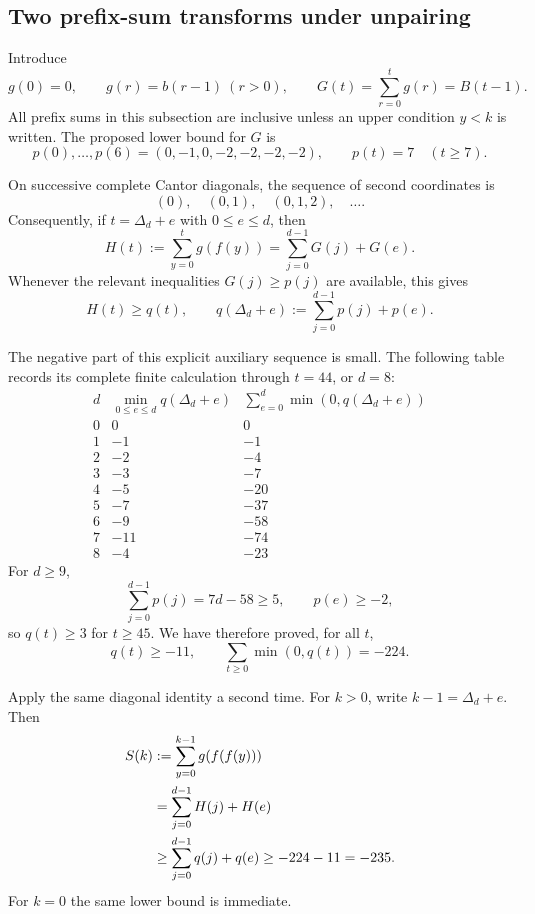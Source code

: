 \subsection{Two prefix-sum transforms under unpairing}

Introduce
\[
 g(0)=0,\qquad g(r)=b(r-1)\ (r>0),\qquad
 G(t)=\sum_{r=0}^t g(r)=B(t-1).
\]
All prefix sums in this subsection are inclusive unless an upper
condition $y<k$ is written. The proposed lower bound for $G$ is
\begin{equation}
 p(0),\ldots,p(6)=(0,-1,0,-2,-2,-2,-2),
 \qquad p(t)=7\quad(t\geq7).
 \label{eq:tail-p}
\end{equation}

On successive complete Cantor diagonals, the sequence of second
coordinates is
\[
 (0),\quad(0,1),\quad(0,1,2),\quad\ldots.
\]
Consequently, if $t=\Delta_d+e$ with $0\leq e\leq d$, then
\begin{equation}
 H(t):=\sum_{y=0}^t g(f(y))
       =\sum_{j=0}^{d-1}G(j)+G(e).
 \label{eq:tail-first-transform}
\end{equation}
Whenever the relevant inequalities $G(j)\geq p(j)$ are available, this
gives
\[
 H(t)\geq q(t),\qquad
 q(\Delta_d+e):=\sum_{j=0}^{d-1}p(j)+p(e).
\]

The negative part of this explicit auxiliary sequence is small.
The following table records its complete finite calculation through
$t=44$, or $d=8$:
\[
\begin{array}{c|r|r}
 d&\min_{0\leq e\leq d}q(\Delta_d+e)&
 \displaystyle\sum_{e=0}^d\min(0,q(\Delta_d+e))\\ \hline
 0&0&0\\
 1&-1&-1\\
 2&-2&-4\\
 3&-3&-7\\
 4&-5&-20\\
 5&-7&-37\\
 6&-9&-58\\
 7&-11&-74\\
 8&-4&-23
\end{array}
\]
For $d\geq9$,
\[
 \sum_{j=0}^{d-1}p(j)=7d-58\geq5,\qquad p(e)\geq-2,
\]
so $q(t)\geq3$ for $t\geq45$. We have therefore proved, for all $t$,
\begin{equation}
 q(t)\geq-11,\qquad
 \sum_{t\geq0}\min(0,q(t))=-224.
 \label{eq:tail-q-negative}
\end{equation}

Apply the same diagonal identity a second time. For $k>0$, write
$k-1=\Delta_d+e$. Then
\begin{align}
 S(k)&:=\sum_{y=0}^{k-1}g(f(f(y)))\notag\\
     &=\sum_{j=0}^{d-1}H(j)+H(e)\notag\\
     &\geq\sum_{j=0}^{d-1}q(j)+q(e)
      \geq-224-11=-235.
 \label{eq:tail-235}
\end{align}
For $k=0$ the same lower bound is immediate.

